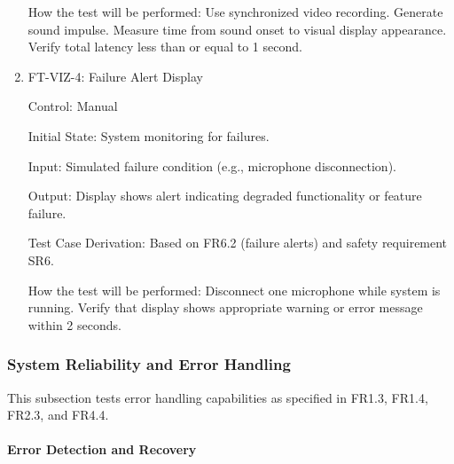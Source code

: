\documentclass[12pt, titlepage]{article}
\begin{document}
\begin{enumerate}
How the test will be performed: Use synchronized video recording. Generate sound
impulse. Measure time from sound onset to visual display appearance. Verify
total latency less than or equal to 1 second.

\item{FT-VIZ-4: Failure Alert Display\\}

Control: Manual
					
Initial State: System monitoring for failures.
					
Input: Simulated failure condition (e.g., microphone disconnection).
					
Output: Display shows alert indicating degraded functionality or feature
failure.

Test Case Derivation: Based on FR6.2 (failure alerts) and safety requirement
SR6.

How the test will be performed: Disconnect one microphone while system is running.
Verify that display shows appropriate warning or error message within 2 seconds.

\end{enumerate}

\subsubsection{System Reliability and Error Handling}

This subsection tests error handling capabilities as specified in FR1.3, FR1.4,
FR2.3, and FR4.4.

\paragraph{Error Detection and Recovery}
\end{document}

